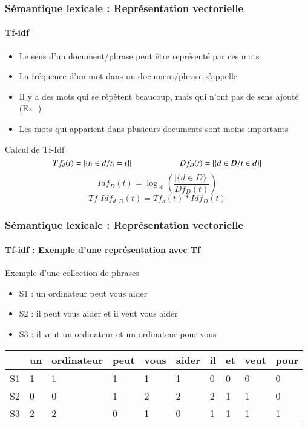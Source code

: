 \documentclass[xcolor=table]{beamer}
\begin{document}
\begin{frame}
\frametitle{Sémantique lexicale : Représentation vectorielle}
\framesubtitle{Tf-idf}

\begin{itemize}
	\item Le sens d'un document/phrase peut être représenté par ces mots 
	\item La fréquence d'un mot dans un document/phrase s'appelle 
	\item Il y a des mots qui se répètent beaucoup, mais qui n'ont pas de sens ajouté (Ex. )
	\item Les mots qui apparient dans plusieurs documents sont moins importants
\end{itemize}

\begin{block}{Calcul de Tf-Idf}
	\[
	Tf_d(t) =  |\{t_i \in d / t_i = t\}|
	\hskip2cm 
	Df_D(t) = |\{d \in D / t \in d\}|
	\]
	\[Idf_D(t) = \log_{10} \left( \frac{|\{d \in D\}|}{Df_D(t)} \right)\]
	\[Tf\text{-}Idf_{d, D}(t) = Tf_d(t) * Idf_D(t)\]
\end{block}

\end{frame}


\begin{frame}
\frametitle{Sémantique lexicale : Représentation vectorielle}
\framesubtitle{Tf-idf : Exemple d'une représentation avec Tf}

\begin{exampleblock}{Exemple d'une collection de phrases}
	\begin{itemize}
		\item S1 : un ordinateur peut vous aider
		\item S2 : il peut vous aider et il veut vous aider
		\item S3 : il veut un ordinateur et un ordinateur pour vous
	\end{itemize}
\end{exampleblock}

\begin{center}
	\begin{tabular}{llllllllll}
	\hline\hline
	& un & ordinateur & peut & vous & aider & il & et & veut & pour \\
	\hline
	S1 & 1 & 1 & 1 & 1 & 1 & 0 & 0 & 0 & 0\\
	S2 & 0 & 0 & 1 & 2 & 2 & 2 & 1 & 1 & 0\\
	S3 & 2 & 2 & 0 & 1 & 0 & 1 & 1 & 1 & 1\\
	\hline\hline
\end{tabular}
\end{center}

\end{frame}
\end{document}
